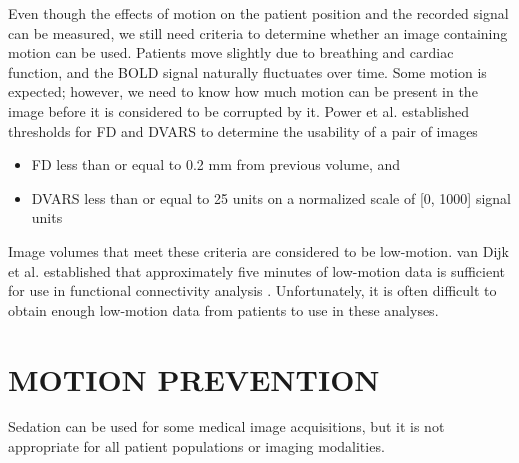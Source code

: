 Even though the effects of motion on the patient position and the recorded signal can be measured, we still need criteria to determine whether an image containing motion can be used. Patients move slightly due to breathing and cardiac function, and the BOLD signal naturally fluctuates over time. Some motion is expected; however, we need to know how much motion can be present in the image before it is considered to be corrupted by it. Power et al. established thresholds for FD and DVARS to determine the usability of a pair of images
\begin{itemize}
\item FD less than or equal to 0.2 mm from previous volume, and
\item DVARS less than or equal to 25 units on a normalized scale of [0, 1000] signal units \cite{Power2014}
\end{itemize}

Image volumes that meet these criteria are considered to be low-motion. van Dijk et al. established that approximately five minutes of low-motion data is sufficient for use in functional connectivity analysis \cite{VanDijk2012}. Unfortunately, it is often difficult to obtain enough low-motion data from patients to use in these analyses.

\section{MOTION PREVENTION}

Sedation can be used for some medical image acquisitions, but it is not appropriate for all patient populations or imaging modalities. 


